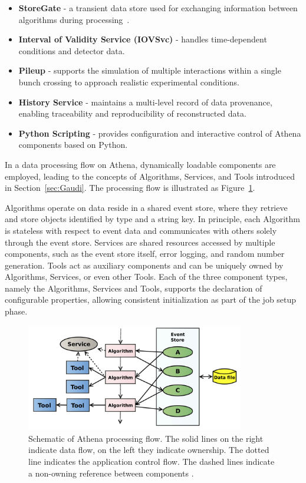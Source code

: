 \begin{itemize}
    \item \textbf{StoreGate} - a transient data store used for exchanging information between algorithms during processing~\cite{AthenaStoreGate}.
    \item \textbf{Interval of Validity Service (IOVSvc)} - handles time-dependent conditions and detector data.
    \item \textbf{Pileup} - supports the simulation of multiple interactions within a single bunch crossing to approach realistic experimental conditions.
    \item \textbf{History Service} - maintains a multi-level record of data provenance, enabling traceability and reproducibility of reconstructed data.
    \item \textbf{Python Scripting} - provides configuration and interactive control of Athena components based on Python.
\end{itemize}

In a data processing flow on Athena, dynamically loadable components are employed, leading to the concepts of Algorithms, Services, and Tools introduced in Section~\ref{sec:Gaudi}. The processing flow is illustrated as Figure~\ref{fig:Athena_process}. 

Algorithms operate on data reside in a shared event store, where they retrieve and store objects identified by type and a string key. In principle, each Algorithm is stateless with respect to event data and communicates with others solely through the event store. Services are shared resources accessed by multiple components, such as the event store itself, error logging, and random number generation. Tools act as auxiliary components and can be uniquely owned by Algorithms, Services, or even other Tools. Each of the three component types, namely the Algorithms, Services and Tools, supports the declaration of configurable properties, allowing consistent initialization as part of the job setup phase.

\begin{figure}[htbp]
  \centering
  \includegraphics[width=0.85\textwidth]{figs/chapter3/Athena_process.png}
  \caption{Schematic of Athena processing flow. The solid lines on the right indicate data flow, on the left they indicate ownership. The dotted line indicates the application control flow. The dashed lines indicate a non-owning reference between components \cite{ATLAScomputing2025}.}
  \label{fig:Athena_process}
\end{figure}


